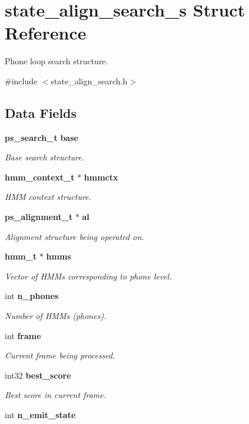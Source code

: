 \section{state\-\_\-align\-\_\-search\-\_\-s Struct Reference}
\label{structstate__align__search__s}


Phone loop search structure.  




{\ttfamily \#include $<$state\-\_\-align\-\_\-search.\-h$>$}

\subsection*{Data Fields}
\begin{DoxyCompactItemize}
\item 
{\bf ps\-\_\-search\-\_\-t} {\bf base}
\begin{DoxyCompactList}\small\item\em Base search structure. \end{DoxyCompactList}\item 
{\bf hmm\-\_\-context\-\_\-t} $\ast$ {\bf hmmctx}
\begin{DoxyCompactList}\small\item\em H\-M\-M context structure. \end{DoxyCompactList}\item 
{\bf ps\-\_\-alignment\-\_\-t} $\ast$ {\bf al}
\begin{DoxyCompactList}\small\item\em Alignment structure being operated on. \end{DoxyCompactList}\item 
{\bf hmm\-\_\-t} $\ast$ {\bf hmms}
\begin{DoxyCompactList}\small\item\em Vector of H\-M\-Ms corresponding to phone level. \end{DoxyCompactList}\item 
int {\bf n\-\_\-phones}
\begin{DoxyCompactList}\small\item\em Number of H\-M\-Ms (phones). \end{DoxyCompactList}\item 
int {\bf frame}
\begin{DoxyCompactList}\small\item\em Current frame being processed. \end{DoxyCompactList}\item 
int32 {\bf best\-\_\-score}
\begin{DoxyCompactList}\small\item\em Best score in current frame. \end{DoxyCompactList}\item 
int {\bf n\-\_\-emit\-\_\-state}\label{structstate__align__search__s_a80c74bac917a8203bb74f5738621ce83}


\end{DoxyCompactItemize}

